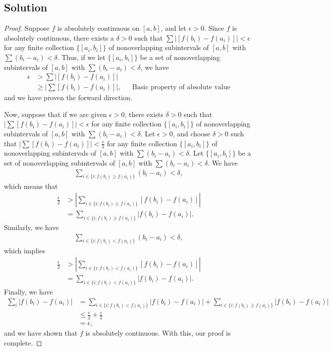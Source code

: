 \documentclass[10pt,a4paper]{article}
\theoremstyle{theorem}
\theoremstyle{definition}
\begin{document}
\subsection*{Solution}
\begin{proof}
Suppose $f$ is absolutely continuous on $[a, b]$, and let $\epsilon > 0$. Since $f$ is absolutely continuous, there exists a $\delta > 0$ such that $\sum |[f(b_i) - f(a_i)]| < \epsilon$ for any finite collection $\{[a_i, b_i]\}$ of nonoverlapping subintervals of $[a, b]$ with $\sum (b_i - a_i) < \delta$. Thus, if we let $\{[a_i, b_i]\}$ be a set of nonoverlapping subintervals of $[a, b]$ with $\sum (b_i - a_i) < \delta$, we have
\begin{align*}
\epsilon &> \sum |[f(b_i) - f(a_i)]|\\
&\geq |\sum [f(b_i) - f(a_i)]|, &&\text{Basic property of absolute value}
\end{align*}
and we have proven the forward direction.

Now, suppose that if we are given $\epsilon > 0$, there exists $\delta > 0$ such that $|\sum [f(b_i) - f(a_i)]| < \epsilon$ for any finite collection $\{[a_i, b_i]\}$ of nonoverlapping subintervals of $[a, b]$ with $\sum (b_i - a_i) < \delta$. Let $\epsilon > 0$, and choose $\delta > 0$ such that $|\sum [f(b_i) - f(a_i)]| < \frac{\epsilon}{2}$ for any finite collection $\{[a_i, b_i]\}$ of nonoverlapping subintervals of $[a, b]$ with $\sum (b_i - a_i) < \delta$. Let $\{[a_i, b_i]\}$ be a set of nonoverlapping subintervals of $[a, b]$ with $\sum (b_i - a_i) < \delta$. We have
\begin{align*}
\sum_{i \in \{i: f(b_i) \geq f(a_i)\}} (b_i - a_i) < \delta,
\end{align*}
which means that 
\begin{align*}
\frac{\epsilon}{2} &> \left|\sum_ {i \in \{i: f(b_i) \geq f(a_i)\}}[f(b_i) - f(a_i)]\right|\\
&= \sum_{i \in \{i: f(b_i) \geq f(a_i)\}}|f(b_i) - f(a_i)|.
\end{align*}
Similarly, we have
\begin{align*}
\sum_{i \in \{i: f(b_i) < f(a_i)\}} (b_i - a_i) < \delta,
\end{align*}
which implies
\begin{align*}
\frac{\epsilon}{2} &> \left|\sum_{i \in \{i: f(b_i) < f(a_i)\}}[f(b_i) - f(a_i)]\right|\\
&= \sum_ {i \in \{i: f(b_i) < f(a_i)\}}|f(b_i) - f(a_i)|.
\end{align*}
Finally, we have
\begin{align*}
\sum_ {i}|f(b_i) - f(a_i)| &= \sum_ {i \in \{i: f(b_i) < f(a_i)\}}|f(b_i) - f(a_i)| + \sum_ {i \in \{i: f(b_i) \geq f(a_i)\}}|f(b_i) - f(a_i)|\\
&\leq \frac{\epsilon}{2} + \frac{\epsilon}{2}\\
&= \epsilon,
\end{align*}
and we have shown that $f$ is absolutely continuous. With this, our proof is complete.
\end{proof}
\end{document}
